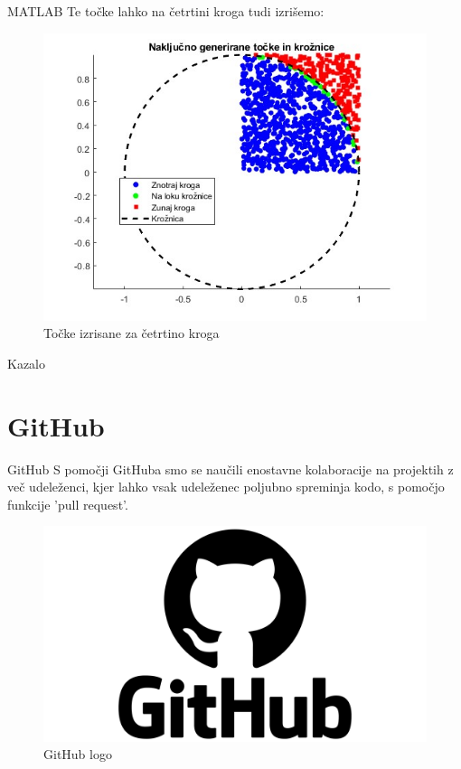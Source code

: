 \documentclass{beamer}
\begin{document}
\begin{frame}{\small MATLAB}
    Te točke lahko na četrtini kroga tudi izrišemo:
    \begin{figure}
        \centering
        \includegraphics[scale=0.38]{točke.jpg}
        \caption{Točke izrisane za četrtino kroga}
        \label{KROG}
    \end{figure}
\end{frame}

\begin{frame}{\small Kazalo}
    \tableofcontents
\end{frame}

\section{GitHub}
\begin{frame}{\small GitHub}
    S pomočji GitHuba smo se naučili enostavne kolaboracije na projektih z več udeleženci, kjer lahko vsak udeleženec poljubno spreminja kodo, s pomočjo funkcije 'pull request'.

    \begin{figure}
        \centering
        \includegraphics[scale=0.05]{GitHub-logo.png}
        \caption{GitHub logo}
        \label{GITHUB}
    \end{figure}
\end{frame}
\end{document}
